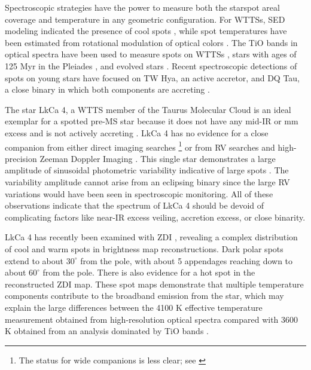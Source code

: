 \documentclass[twocolumn]{emulateapj}%
\newcommand{\name}{LkCa 4 }
\begin{document}
Spectroscopic strategies have the power to measure both the starspot areal coverage and temperature in any geometric configuration.  For WTTSs, SED modeling indicated the presence of cool spots \citep{wolk96}, while spot temperatures have been estimated from rotational modulation of optical colors \citep[e.g.][]{grankin98,venuti15,koen16}.  The TiO bands in optical spectra have been used to measure spots on WTTSs \citep{petrov94}, stars with ages of 125 Myr in the Pleiades \citep{fang2016}, and evolved stars \citep[e.g.][]{neff95,oneal01,oneal04}.  Recent spectroscopic detections of spots on young stars have focused on TW Hya, an active accretor, and DQ Tau, a close binary in which both components are accreting \citep{debes13,bary14}.  

The star LkCa 4, a WTTS member of the Taurus Molecular Cloud \citep{herbig86,strom89a,downes88,strom89b} is an ideal exemplar for a spotted pre-MS star because it does not have any mid-IR or mm excess \citep[\emph{e.g.}][]{andrews05,furlan06,buckle15} and is not actively accreting \citep[\emph{e.g.}][]{edwards06,cauley12}.  LkCa 4 has no evidence for a close companion from either direct imaging searches \citep{karr10,kraus11,daemgen15}\footnote{The status for wide companions is less clear; see \citet{stauffer91,itoh08,kraus09,kraus11,herczeg14}} or from RV searches \citep{nguyen12} and high-precision Zeeman Doppler Imaging \citep{donati14}.  This single star demonstrates a large amplitude of sinusoidal photometric variability indicative of large spots \citep{grankin08,xiao12}.  The variability amplitude cannot arise from an eclipsing binary since the large RV variations would have been seen in spectroscopic monitoring.  All of these observations indicate that the spectrum of \name should be devoid of complicating factors like near-IR excess veiling, accretion excess, or close binarity.    

LkCa 4 has recently been examined with ZDI \citep{donati14}, revealing a complex distribution of cool and warm spots in brightness map reconstructions.  Dark polar spots extend to about $30^\circ$ from the pole, with about 5 appendages reaching down to about $60^\circ$ from the pole.  There is also evidence for a hot spot in the reconstructed ZDI map.  These spot maps demonstrate that multiple temperature components contribute to the broadband emission from the star, which may explain the large differences between the 4100 K effective temperature measurement obtained from high-resolution optical spectra \citep{donati14} compared with 3600 K obtained from an analysis dominated by TiO bands \citep{herczeg14}.
\end{document}
